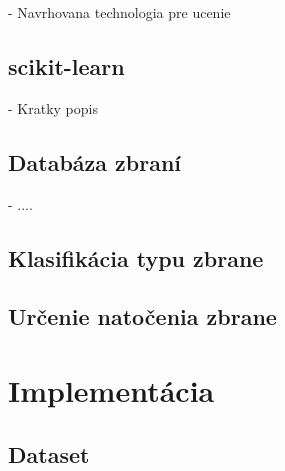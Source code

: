 - Navrhovana technologia pre ucenie

\section{scikit-learn}
- Kratky popis

\section{Databáza zbraní}
- ....

\section{Klasifikácia typu zbrane}

\section{Určenie natočenia zbrane}


\pagebreak
\chapter{Implementácia}

\section{Dataset}
